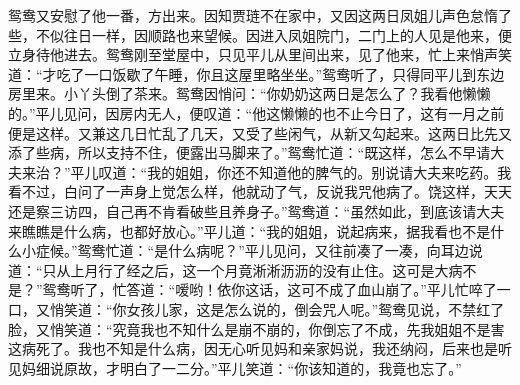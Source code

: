 \begin{parag}
    鸳鸯又安慰了他一番，方出来。因知贾琏不在家中，又因这两日凤姐儿声色怠惰了些，不似往日一样，因顺路也来望候。因进入凤姐院门，二门上的人见是他来，便立身待他进去。鸳鸯刚至堂屋中，只见平儿从里间出来，见了他来，忙上来悄声笑道：“才吃了一口饭歇了午睡，你且这屋里略坐坐。”鸳鸯听了，只得同平儿到东边房里来。小丫头倒了茶来。鸳鸯因悄问：“你奶奶这两日是怎么了？我看他懒懒的。”平儿见问，因房内无人，便叹道：“他这懒懒的也不止今日了，这有一月之前便是这样。又兼这几日忙乱了几天，又受了些闲气，从新又勾起来。这两日比先又添了些病，所以支持不住，便露出马脚来了。”鸳鸯忙道：“既这样，怎么不早请大夫来治？”平儿叹道：“我的姐姐，你还不知道他的脾气的。别说请大夫来吃药。我看不过，白问了一声身上觉怎么样，他就动了气，反说我咒他病了。饶这样，天天还是察三访四，自己再不肯看破些且养身子。”鸳鸯道：“虽然如此，到底该请大夫来瞧瞧是什么病，也都好放心。”平儿道：“我的姐姐，说起病来，据我看也不是什么小症候。”鸳鸯忙道：“是什么病呢？”平儿见问，又往前凑了一凑，向耳边说道：“只从上月行了经之后，这一个月竟淅淅沥沥的没有止住。这可是大病不是？”鸳鸯听了，忙答道：“嗳哟！依你这话，这可不成了血山崩了。”平儿忙啐了一口，又悄笑道：“你女孩儿家，这是怎么说的，倒会咒人呢。”鸳鸯见说，不禁红了脸，又悄笑道：“究竟我也不知什么是崩不崩的，你倒忘了不成，先我姐姐不是害这病死了。我也不知是什么病，因无心听见妈和亲家妈说，我还纳闷，后来也是听见妈细说原故，才明白了一二分。”平儿笑道：“你该知道的，我竟也忘了。”
\end{parag}


